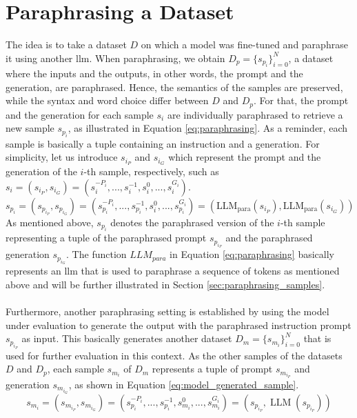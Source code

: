 \section{Paraphrasing a Dataset}
The idea is to take a dataset $D$ on which a model was fine-tuned and paraphrase it using another \acrshort{llm}. When paraphrasing, we obtain $D_p = \{s_{p_i}\}_{i=0}^N$, a dataset where the inputs and the outputs, in other words, the prompt and the generation, are paraphrased. Hence, the semantics of the samples are preserved, while the syntax and word choice differ between $D$ and $D_p$. For that, the prompt and the generation for each sample $s_i$ are individually paraphrased to retrieve a new sample $s_{p_i}$, as illustrated in Equation \ref{eq:paraphrasing}. As a reminder, each sample is basically a tuple containing an instruction and a generation. For simplicity, let us introduce $s_{i_P}$ and $s_{i_G}$ which represent the prompt and the generation of the $i$-th sample, respectively, such as $s_i = (s_{i_P}, s_{i_G}) = (s_i^{-P_i},...,s_i^{-1}, s_i^0,...,s_i^{G_i})$.
\begin{equation}
    s_{p_i} = 
    (
    s_{p_{i_P}},
    s_{p_{i_G}}
    ) =
    (
        s_{p_i}^{-P_i},...,s_{p_i}^{-1},
        s_i^0,...,s_{p_i}^{G_i}
    ) = 
    (
        \operatorname{LLM_{para}}(s_{i_P}), 
        \operatorname{LLM_{para}}(s_{i_G})
    )
    \label{eq:paraphrasing}
\end{equation}
As mentioned above, $s_{p_i}$ denotes the paraphrased version of the $i$-th sample representing a tuple of the paraphrased prompt $s_{p_{i_P}}$ and the paraphrased generation $s_{p_{i_G}}$. The function $LLM_{para}$ in Equation \ref{eq:paraphrasing} basically represents an \acrshort{llm} that is used to paraphrase a sequence of tokens as mentioned above and will be further illustrated in Section \ref{sec:paraphrasing_samples}.
\\\\
Furthermore, another paraphrasing setting is established by using the model under evaluation to generate the output with the paraphrased instruction prompt $s_{p_{i_P}}$ as input. This basically generates another dataset $D_m = \{s_{m_i}\}_{i=0}^N$ that is used for further evaluation in this context. As the other samples of the datasets $D$ and $D_p$, each sample $s_{m_i}$ of $D_m$ represents a tuple of prompt $s_{m_{i_P}}$ and generation $s_{m_{i_G}}$, as shown in Equation \ref{eq:model_generated_sample}.
\begin{equation}
    s_{m_i} = 
    (
    s_{m_{i_P}},
    s_{m_{i_G}}
    ) =
    (
        s_{p_i}^{-P_i},...,s_{p_i}^{-1},
        s_{m_i}^0,...,s_{m_i}^{G_i}
    ) = 
    (
        s_{p_{i_P}}, 
        \operatorname{LLM}(s_{p_{i_P}})
    )
    \label{eq:model_generated_sample}
\end{equation}
